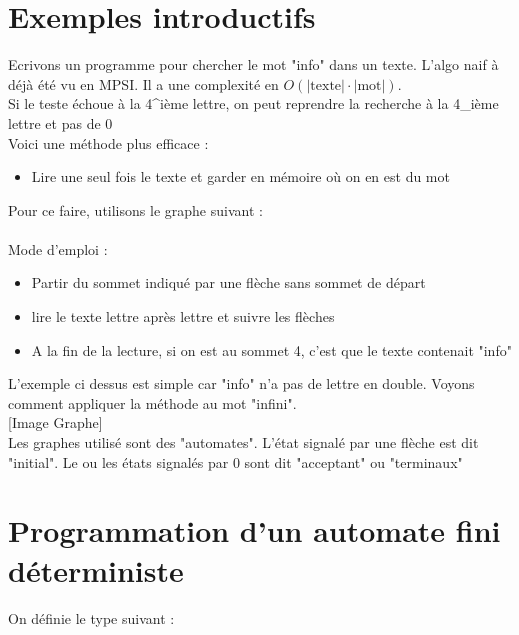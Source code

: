 

    \section{Exemples introductifs}
    Ecrivons un programme pour chercher le mot "info" dans un texte. L'algo naif à déjà été vu en MPSI.
    Il a une complexité en $O(|\text{texte}|\cdot |\text{mot|})$. \\

    Si le teste échoue à la 4^{ième} lettre, on peut reprendre la recherche à la 4_{ième} lettre 
    et pas de 0 \\

    Voici une méthode plus efficace : \\
    \begin{itemize}
        \item Lire une seul fois le texte et garder en mémoire où on en est du mot
    \end{itemize}

    Pour ce faire, utilisons le graphe suivant : \\
    [Image graphe]\\

    Mode d'emploi :
    \begin{itemize}
        \item Partir du sommet indiqué par une flèche sans sommet de départ
        \item lire le texte lettre après lettre et suivre les flèches
        \item A la fin de la lecture, si on est au sommet 4, c'est que le texte contenait "info"
    \end{itemize}

    L'exemple ci dessus est simple car "info" n'a pas de lettre en double. Voyons comment appliquer la méthode au mot "infini".\\

    [Image Graphe]\\

    Les graphes utilisé sont des "automates". L'état signalé par une flèche est dit "initial". Le ou les 
    états signalés par 0 sont dit "acceptant" ou "terminaux"

    \section{Programmation d'un automate fini déterministe}

On définie le type suivant :

